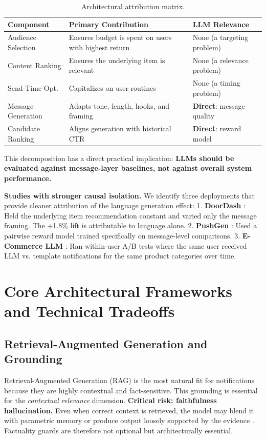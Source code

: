 \documentclass[11pt]{article}
\begin{document}
\begin{table}[h]
\caption{Architectural attribution matrix.}
\label{tab:attribution}
\begin{tabular}{p{3cm}p{7cm}p{4cm}}
\toprule
\textbf{Component} & \textbf{Primary Contribution} & \textbf{LLM Relevance} \\
\midrule
Audience Selection & Ensures budget is spent on users with highest return & None (a targeting problem) \\
Content Ranking & Ensures the underlying item is relevant & None (a relevance problem) \\
Send-Time Opt. & Capitalizes on user routines & None (a timing problem) \\
Message Generation & Adapts tone, length, hooks, and framing & \textbf{Direct}: message quality \\
Candidate Ranking & Aligns generation with historical CTR & \textbf{Direct}: reward model \\
\bottomrule
\end{tabular}
\end{table}

This decomposition has a direct practical implication: \textbf{LLMs should be evaluated against message-layer baselines, not against overall system performance.}

\textbf{Studies with stronger causal isolation.} We identify three deployments that provide cleaner attribution of the language generation effect:
1. \textbf{DoorDash} \citep{sinha2024doordash}: Held the underlying item recommendation constant and varied only the message framing. The +1.8\% lift is attributable to language alone.
2. \textbf{PushGen} \citep{bie2026pushgen}: Used a pairwise reward model trained specifically on message-level comparisons.
3. \textbf{E-Commerce LLM} \citep{acm2025ecommerce}: Ran within-user A/B tests where the same user received LLM vs. template notifications for the same product categories over time.

\section{Core Architectural Frameworks and Technical Tradeoffs}

\subsection{Retrieval-Augmented Generation and Grounding}

Retrieval-Augmented Generation (RAG) \citep{lewis2020retrieval} is the most natural fit for notifications because they are highly contextual and fact-sensitive. This grounding is essential for the \textit{contextual relevance} dimension. \textbf{Critical risk: faithfulness hallucination.} Even when correct context is retrieved, the model may blend it with parametric memory or produce output loosely supported by the evidence \citep{emnlp2025benchmarking}. Factuality guards are therefore not optional but architecturally essential.
\end{document}
